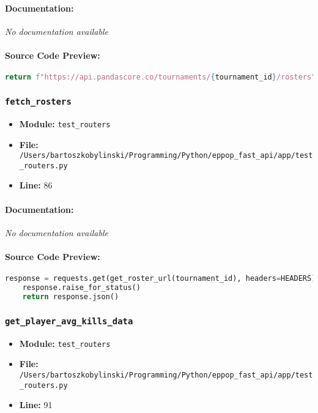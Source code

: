 \documentclass[11pt,a4paper]{article}
\begin{document}
\paragraph{Documentation:} \textit{No documentation available}

\paragraph{Source Code Preview:}
\begin{lstlisting}[language=Python]
    return f"https://api.pandascore.co/tournaments/{tournament_id}/rosters"
\end{lstlisting}

\vspace{1em}
\subsubsection{\texttt{fetch\_rosters}}

\begin{itemize}
    \item \textbf{Module:} \texttt{test\_routers}
    \item \textbf{File:} \texttt{/Users/bartoszkobylinski/Programming/Python/eppop\_fast\_api/app/test\_routers.py}
    \item \textbf{Line:} 86
\end{itemize}

\paragraph{Documentation:} \textit{No documentation available}

\paragraph{Source Code Preview:}
\begin{lstlisting}[language=Python]
    response = requests.get(get_roster_url(tournament_id), headers=HEADERS)
    response.raise_for_status()
    return response.json()
\end{lstlisting}

\vspace{1em}
\subsubsection{\texttt{get\_player\_avg\_kills\_data}}

\begin{itemize}
    \item \textbf{Module:} \texttt{test\_routers}
    \item \textbf{File:} \texttt{/Users/bartoszkobylinski/Programming/Python/eppop\_fast\_api/app/test\_routers.py}
    \item \textbf{Line:} 91
\end{itemize}
\end{document}
